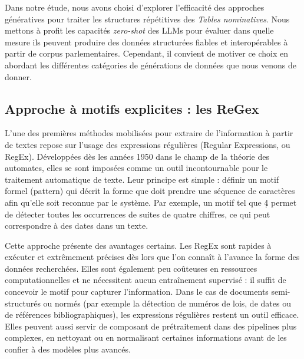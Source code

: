 Dans notre étude, nous avons choisi d’explorer l’efficacité des approches génératives pour traiter les structures répétitives des \emph{Tables nominatives}. Nous mettons à profit les capacités \emph{zero-shot} des LLMs pour évaluer dans quelle mesure ils peuvent produire des données structurées fiables et interopérables à partir de corpus parlementaires. Cependant, il convient de motiver ce choix en abordant les différentes catégories de générations de données que nous venons de donner.

\subsection{Approche à motifs explicites : les ReGex}

L’une des premières méthodes mobilisées pour extraire de l’information à partir de textes repose sur l’usage des expressions régulières (Regular Expressions, ou RegEx). Développées dès les années 1950 dans le champ de la théorie des automates, elles se sont imposées comme un outil incontournable pour le traitement automatique de texte. Leur principe est simple : définir un motif formel (pattern) qui décrit la forme que doit prendre une séquence de caractères afin qu’elle soit reconnue par le système. Par exemple, un motif tel que \d{4} permet de détecter toutes les occurrences de suites de quatre chiffres, ce qui peut correspondre à des dates dans un texte.

Cette approche présente des avantages certains. Les RegEx sont rapides à exécuter et extrêmement précises dès lors que l’on connaît à l’avance la forme des données recherchées. Elles sont également peu coûteuses en ressources computationnelles et ne nécessitent aucun entraînement supervisé : il suffit de concevoir le motif pour capturer l’information. Dans le cas de documents semi-structurés ou normés (par exemple la détection de numéros de lois, de dates ou de références bibliographiques), les expressions régulières restent un outil efficace. Elles peuvent aussi servir de composant de prétraitement dans des pipelines plus complexes, en nettoyant ou en normalisant certaines informations avant de les confier à des modèles plus avancés.

